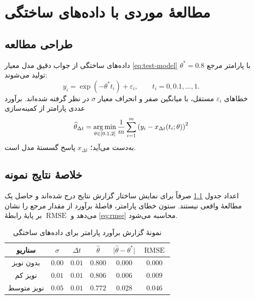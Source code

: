 \chapter{مطالعهٔ موردی با داده‌های ساختگی}
\label{chap4}

\section{طراحی مطالعه}

داده‌های ساختگی از جواب دقیق مدل معیار \eqref{eq:test-model} با پارامتر مرجع $\theta^{\ast}=0.8$ تولید می‌شوند:
\begin{equation}
  y_i=\exp(-\theta^{\ast}t_i)+\varepsilon_i,
  \qquad t_i=0,0.1,\ldots,1.
  \label{eq:synthetic-data}
\end{equation}
خطاهای $\varepsilon_i$ مستقل، با میانگین صفر و انحراف معیار $\sigma$ در نظر گرفته شده‌اند. برآورد عددی پارامتر از کمینه‌سازی
\begin{equation}
  \widehat{\theta}_{\Delta t}
  =\operatorname*{arg\,min}_{\theta\in[0.1,2]}
  \frac{1}{m}\sum_{i=1}^{m}
  \left(y_i-x_{\Delta t}(t_i;\theta)\right)^2
  \label{eq:parameter-estimate}
\end{equation}
به‌دست می‌آید؛ $x_{\Delta t}$ پاسخ گسستهٔ مدل است.

\section{خلاصهٔ نتایج نمونه}

اعداد جدول \ref{tab:synthetic-results} صرفاً برای نمایش ساختار گزارش نتایج درج شده‌اند و حاصل یک مطالعهٔ واقعی نیستند. ستون خطای پارامتر، فاصلهٔ برآورد از مقدار مرجع را نشان می‌دهد و $\operatorname{RMSE}$ بر پایهٔ رابطهٔ \eqref{eq:rmse} محاسبه می‌شود.

\begin{table}[htbp]
  \centering
  \begin{tabular}{cccccc}
    \toprule
    سناریو & $\sigma$ & $\Delta t$ & $\widehat{\theta}$
    & $\lvert\widehat{\theta}-\theta^{\ast}\rvert$
    & $\operatorname{RMSE}$ \\
    \midrule
    بدون نویز & $0.00$ & $0.01$ & $0.800$ & $0.000$ & $0.000$ \\
    نویز کم & $0.01$ & $0.01$ & $0.806$ & $0.006$ & $0.009$ \\
    نویز متوسط & $0.05$ & $0.01$ & $0.772$ & $0.028$ & $0.046$ \\
    \bottomrule
  \end{tabular}
  \caption{نمونهٔ گزارش برآورد پارامتر برای داده‌های ساختگی}
  \label{tab:synthetic-results}
\end{table}

